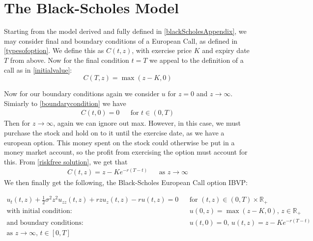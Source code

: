 \documentclass[11pt]{article} %
\begin{document}
\section{The Black-Scholes Model}
Starting from the model derived and fully defined in \ref{blackScholesAppendix}, we may consider final and boundary 
conditions of a European Call, as defined in \ref{typesofoption}. We define this as 
$C(t,z)$, with exercise price $K$ and expiry date $T$ from above. Now for the final 
condition $t=T$ we appeal to the definition of a call as in \eqref{initialvalue}:
\begin{equation}
    C(T, z) = \max{(z-K, 0)}
\end{equation}

Now for our boundary conditions again we consider $u$ for $z=0$ and $z \to \infty$. Simiarly 
to \eqref{boundarycondition} we have 
\begin{align}
    C(t, 0) = 0 &&\text{for } t \in (0,T)
\end{align}
Then for $z \to \infty$, again we can ignore out max. However, in this case, we must 
purchase the stock and hold on to it until the exercise date, as we have a 
european option. This money spent on the stock could otherwise be put in a 
money market account, so the profit from exercising the option must account for this.
From \eqref{riskfree solution}, we get that 
\begin{align}
    C(t,z) = z - Ke^{-r(T-t)} &&\text{as } z \to \infty
\end{align}
We then finally get the following, the Black-Scholes European Call option IBVP:

\begin{align}
    u_t(t,z) +\frac{1}{2}\sigma^2z^2u_{zz}(t,z) + rzu_z(t,z) - ru(t,z) = 0 &&
    \text{for $(t,z) \in (0,T) \times \mathbb{R}_+ $}\\
    \text{with initial condition: } &&
     u(0,z) = \max{(z-K, 0)} \text{, } z \in \mathbb{R}_+ \\
    \text{and boundary conditions: } && 
    u(t, 0) = 0 \text{,  $u(t,z) = z - Ke^{-r(T-t)}$}\\
    \text{as $z \to \infty $,  $t \in [0,T]$}
\end{align}
\end{document}
